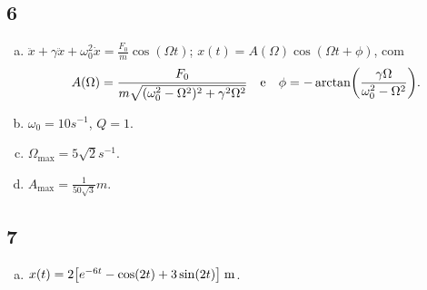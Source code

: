 \documentclass[a4paper,10pt]{article}
\begin{document}
\subsection*{6}

\begin{enumerate}[(a)]
\item $\ddot{x} + \gamma \ddot{x} + \omega_0^2 \dot{x} = \frac{F_0}{m} \cos(\Omega t)$;
$x(t) = A(\Omega) \cos(\Omega t + \phi)$, com
$$
A(\Omega) = \frac{F_0}{m \sqrt{(\omega_0^2-\Omega^2)^2 + \gamma^2\Omega^2}}
\quad \mathrm{e} \quad
\phi = - \arctan(\frac{\gamma \Omega}{\omega_0^2 - \Omega^2}).
$$

\item $\omega_0 = 10 \unit{s^{-1}}$, $Q = 1$.

\item $\Omega_{\text{max}} = 5\sqrt{2} \unit{s^{-1}}$.

\item $A_{\text{max}} = \frac{1}{50\sqrt{3}} \unit{m}$.
\end{enumerate}

\subsection*{7}

\begin{enumerate}[(a)]
\item $x(t) = 2 \qty[e^{-6t} - \cos(2t) + 3 \sin(2t)] \; \mathrm{m}$.
\end{enumerate}
\end{document}
